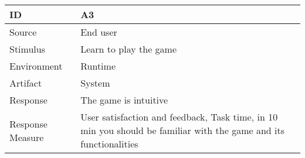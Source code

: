 \begin{center}
    \begin{tabular}{ | l | p{12cm} |}
    \hline
	\textbf{ID} & \textbf{A3} \\ \hline
	Source & End user\\ \hline 
	Stimulus & Learn to play the game  \\ \hline 
	Environment & Runtime\\ \hline 
	Artifact & System \\ \hline 
	Response & The game is intuitive\\ \hline 
	Response Measure & User satisfaction and feedback, Task time, in 10 min you should be familiar with the game and its functionalities\\ \hline 

    \hline
    \end{tabular}
\end{center}













